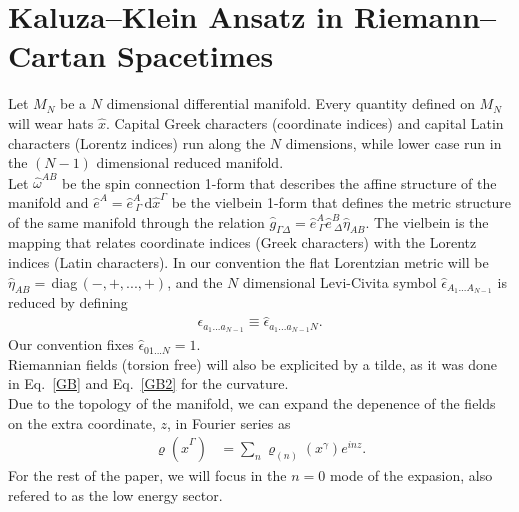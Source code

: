 \documentclass[aps,prd,12pt,superscriptaddress,showpacs,showkeys,longbibliography,reprint]{revtex4-1}
\begin{document}
\section{Kaluza--Klein Ansatz in Riemann--Cartan Spacetimes\label{KK}}
Let $M_N$ be a $N$ dimensional differential manifold. Every quantity defined on $M_N$ will wear hats $\hat{x}$. Capital Greek characters (coordinate indices) and capital Latin characters (Lorentz indices) run along the $N$ dimensions, while lower case run in the $(N-1)$ dimensional reduced manifold.\\
Let $\hat{\omega}^{AB}$ be the spin connection 1-form that describes the affine structure of the manifold and $\hat{e}^A=\hat{e}^{A}_{\ \Gamma}\,\text{d}\hat{x}^\Gamma$ be the vielbein 1-form that defines the metric structure of the same manifold through the relation $\hat{g}_{\Gamma\Delta}=\hat{e}^{A}_{\ \Gamma}\hat{e}^{B}_{\ \Delta}\hat{\eta}_{AB}$. The vielbein is the mapping that relates coordinate indices (Greek characters) with the Lorentz indices (Latin characters). In our convention the flat Lorentzian metric will be $\hat{\eta}_{AB}=\,$diag$\,(-,+,...,+)$, and the $N$ dimensional Levi-Civita symbol $\hat{\epsilon}_{A_1...A_{N-1}}$ is reduced by defining
\begin{align*}
\epsilon_{a_1...a_{N-1}}\equiv\hat{\epsilon}_{a_1...a_{N-1}N}.
\end{align*} 
Our convention fixes $\hat{\epsilon}_{01...N}=1$.\\
Riemannian fields (torsion free) will also be explicited by a tilde, as it was done in Eq.~\eqref{GB} and Eq.~\eqref{GB2} for the curvature.\\
Due to the topology of the manifold, we can expand the depenence of the fields on the extra coordinate, $z$, in Fourier series as  
\begin{align}\label{Fourier}
\varrho(\hat{x}^\Gamma)&=\sum_n\varrho_{(n)}(x^\gamma)e^{in z}.
\end{align}
For the rest of the paper, we will focus in the $n=0$ mode of the expasion, also refered to as the low energy sector.
\end{document}
